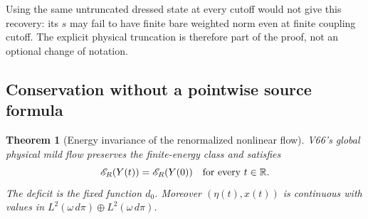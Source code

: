 \documentclass[11pt]{article}
\newtheorem{theorem}{Theorem}[section]
\theoremstyle{remark}
\begin{document}
Using the same untruncated dressed state at every cutoff
would not give this recovery: its \(s\) may fail to have
finite bare weighted norm even at finite coupling cutoff.
The explicit physical truncation is therefore part of
the proof, not an optional change of notation.

\subsection{Conservation without a pointwise source formula}

\begin{theorem}[Energy invariance of the renormalized nonlinear flow]
\label{thm:v20v67-conservation}
V66's global physical mild flow preserves the finite-energy
class and satisfies
\[
 \mathscr E_R(Y(t))=\mathscr E_R(Y(0))
                  \quad\hbox{for every }t\in\mathbb R .
\]
The deficit is the fixed function \(d_0\).
Moreover \((\eta(t),x(t))\) is continuous with values in
\(L^2(\omega\,d\pi)\oplus L^2(\omega\,d\pi)\).
\end{theorem}
\end{document}
